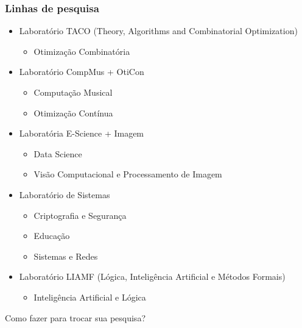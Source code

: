 \documentclass{beamer}
\begin{document}
\begin{frame}
  \frametitle{Linhas de pesquisa}

  \footnotesize
  \begin{itemize}
    \item Laboratório TACO (Theory, Algorithms and Combinatorial Optimization)
      \begin{itemize}\scriptsize
        \item Otimização Combinatória
      \end{itemize}\pause
    \item Laboratório CompMus + OtiCon
      \begin{itemize}\scriptsize
        \item Computação Musical
        \item Otimização Contínua
      \end{itemize}\pause
    \item Laboratória E-Science + Imagem
      \begin{itemize}\scriptsize
        \item Data Science
        \item Visão Computacional e Processamento de Imagem
      \end{itemize}\pause
    \item Laboratório de Sistemas
      \begin{itemize}\scriptsize
        \item Criptografia e Segurança
        \item Educação
        \item Sistemas e Redes
      \end{itemize}\pause
    \item Laboratório LIAMF (Lógica, Inteligência Artificial e Métodos Formais)
      \begin{itemize}\scriptsize
        \item Inteligência Artificial e Lógica
      \end{itemize}
  \end{itemize}

  \small Como fazer para trocar sua pesquisa?
\end{frame}
\end{document}
